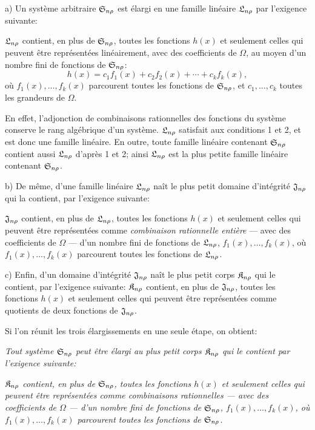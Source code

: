 a) Un système arbitraire $\mathfrak{S}_{n\rho}$ est élargi en une famille linéaire $\mathfrak{L}_{n\rho}$ par l'exigence suivante:

$\mathfrak{L}_{n\rho}$ contient, en plus de $\mathfrak{S}_{n\rho}$, toutes les fonctions $h(x)$ et seulement celles qui peuvent être représentées linéairement, avec des coefficients de $\Omega$, au moyen d'un nombre fini de fonctions de $\mathfrak{S}_{n\rho}$:
\[
  h(x)=c_1f_1(x)+c_2f_2(x)+\cdots+c_kf_k(x),
\]
où $f_1(x),\ldots,f_k(x)$ parcourent toutes les fonctions de $\mathfrak{S}_{n\rho}$, et $c_1,
\ldots,c_k$ toutes les grandeurs de $\Omega$.

En effet, l'adjonction de combinaisons rationnelles des fonctions du système conserve le rang algébrique d'un système. $\mathfrak{L}_{n\rho}$ satisfait aux conditions 1 et 2, et est donc une famille linéaire. En outre, toute famille linéaire contenant $\mathfrak{S}_{n\rho}$ contient aussi $\mathfrak{L}_{n\rho}$ d'après 1 et 2; ainsi $\mathfrak{L}_{n\rho}$ est la plus petite famille linéaire contenant $\mathfrak{S}_{n\rho}$.

b) De même, d'une famille linéaire $\mathfrak{L}_{n\rho}$ naît le plus petit domaine d’intégrité $\mathfrak{J}_{n\rho}$ qui la contient, par l'exigence suivante:

$\mathfrak{J}_{n\rho}$ contient, en plus de $\mathfrak{L}_{n\rho}$, toutes les fonctions $h(x)$ et seulement celles qui peuvent être représentées comme \emph{combinaison rationnelle entière} --- avec des coefficients de $\Omega$ --- d'un nombre fini de fonctions de $\mathfrak{L}_{n\rho}$, $f_1(x),\ldots,f_k(x)$, où $f_1(x),\ldots,f_k(x)$ parcourent toutes les fonctions de $\mathfrak{L}_{n\rho}$.

c) Enfin, d'un domaine d’intégrité $\mathfrak{J}_{n\rho}$ naît le plus petit corps $\mathfrak{K}_{n\rho}$ qui le contient, par l'exigence suivante: $\mathfrak{K}_{n\rho}$ contient, en plus de $\mathfrak{J}_{n\rho}$, toutes les fonctions $h(x)$ et seulement celles qui peuvent être représentées comme quotients de deux fonctions de $\mathfrak{J}_{n\rho}$.

Si l'on réunit les trois élargissements en une seule étape, on obtient:

\emph{Tout système $\mathfrak{S}_{n\rho}$ peut être élargi au plus petit corps $\mathfrak{K}_{n\rho}$ qui le contient par l'exigence suivante:}

\emph{$\mathfrak{K}_{n\rho}$ contient, en plus de $\mathfrak{S}_{n\rho}$, toutes les fonctions $h(x)$ et seulement celles qui peuvent être représentées comme combinaisons rationnelles --- avec des coefficients de $\Omega$ --- d'un nombre fini de fonctions de $\mathfrak{S}_{n\rho}$, $f_1(x),\ldots,f_k(x)$, où $f_1(x),\ldots,f_k(x)$ parcourent toutes les fonctions de $\mathfrak{S}_{n\rho}$.}

